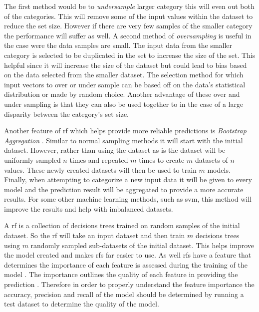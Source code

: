  
The first method would be to \textit{undersample} larger category this will even out both of the categories. This will remove some of the input values within the dataset to reduce the set size. However if there are very few samples of the smaller category the performance will suffer as well. A second method of \textit{oversampling} is useful in the case were the data samples are small. The input data from the smaller category is selected to be duplicated in the set to increase the size of the set. This helpful since it will increase the size of the dataset but could lead to bias based on the data selected from the smaller dataset. The selection method for which input vectors to over or under sample can be based off on the data's statistical distribution or made by random choice. Another advantage of these over and under sampling is that they can also be used together to in the case of a large disparity between the category's set size. 

Another feature of \gls{rf} which helps provide more reliable predictions is \textit{Bootstrap Aggregation} \cite{Westland2011}. Similar to normal sampling methods it will start with the initial dataset. However, rather than using the dataset as is the dataset will be uniformly sampled $n$ times and repeated $m$ times to create $m$ datasets of $n$ values. These newly created datasets will then be used to train $m$ models. Finally, when attempting to categorize a new input data it will be given to every model and the prediction result will be aggregated to provide a more accurate results. For some other machine learning methods, such as \gls{svm}, this method will improve the results and help with imbalanced datasets.

A \gls{rf} is a collection of decisions trees trained on random samples of the initial dataset. So the \gls{rf} will take an input dataset and then train $m$ decisions trees using $m$ randomly sampled sub-datasets of the initial dataset. This helps improve the model created and makes \gls{rf}s far easier to use. As well \gls{rf}s have a feature that determines the importance of each feature is assessed during the training of the model \cite{Westland2011}. The importance outlines the quality of each feature in providing the prediction \cite{Verikas2011}. Therefore in order to properly understand the feature importance the accuracy, precision and recall of the model should be determined by running a test dataset to determine the quality of the model.


